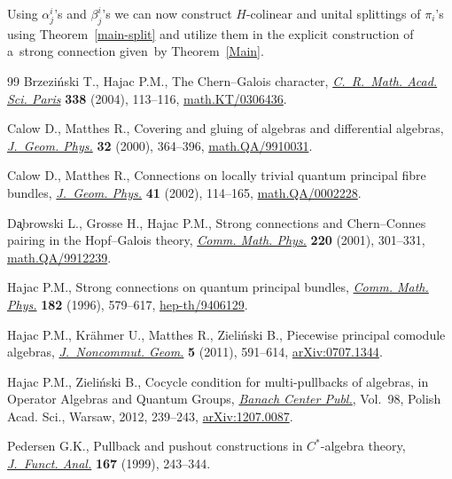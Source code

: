 \documentclass[11pt]{article}
\let\originalcedilla\c
\renewcommand{\c}[1]{{\fontspec{DejaVu Serif}\originalcedilla{#1}}}
\begin{document}
Using $\alpha^i_j$'s and $\beta^i_j$'s we can now construct $H$-colinear and unital splittings of $\pi_i$'s using
Theo\-rem~\ref{main-split} and utilize them in the explicit construction of a~strong connection given~by
Theorem~\ref{Main}.
\begin{thebibliography}{99}
Brzezi{\'n}ski T., Hajac P.M., The {C}hern--{G}alois character,
  \href{http://dx.doi.org/10.1016/j.crma.2003.11.009}{\textit{C.~R.~Math. Acad. Sci. Paris}} \textbf{338} (2004), 113--116,
  \href{http://arxiv.org/abs/math.KT/0306436}{math.KT/0306436}.

Calow D., Matthes R., Covering and gluing of algebras and differential
  algebras, \href{http://dx.doi.org/10.1016/S0393-0440(99)00035-2}{\textit{J.~Geom. Phys.}} \textbf{32} (2000), 364--396,
  \href{http://arxiv.org/abs/math.QA/9910031}{math.QA/9910031}.

Calow D., Matthes R., Connections on locally trivial quantum principal fibre
  bundles, \href{http://dx.doi.org/10.1016/S0393-0440(01)00050-X}{\textit{J.~Geom. Phys.}} \textbf{41} (2002), 114--165,
  \href{http://arxiv.org/abs/math.QA/0002228}{math.QA/0002228}.

D\c{a}browski L., Grosse H., Hajac P.M., Strong connections and
  {C}hern--{C}onnes pairing in the {H}opf--{G}alois theory, \href{http://dx.doi.org/10.1007/s002200100433}{\textit{Comm. Math.
  Phys.}} \textbf{220} (2001), 301--331, \href{http://arxiv.org/abs/math.QA/9912239}{math.QA/9912239}.

Hajac P.M., Strong connections on quantum principal bundles, \href{http://dx.doi.org/10.1007/BF02506418}{\textit{Comm.
  Math. Phys.}} \textbf{182} (1996), 579--617, \href{http://arxiv.org/abs/hep-th/9406129}{hep-th/9406129}.

Hajac P.M., Kr{\"a}hmer U., Matthes R., Zieli{\'n}ski B., Piecewise principal
  comodule algebras, \href{http://dx.doi.org/10.4171/JNCG/88}{\textit{J.~Noncommut. Geom.}} \textbf{5} (2011), 591--614,
  \href{http://arxiv.org/abs/0707.1344}{arXiv:0707.1344}.

Hajac P.M., Zieli{\'n}ski B., Cocycle condition for multi-pullbacks of
  algebras, in Operator Algebras and Quantum Groups, \href{http://dx.doi.org/10.4064/bc98-0-9}{\textit{Banach Center
  Publ.}}, Vol.~98, Polish Acad. Sci., Warsaw, 2012, 239--243,
  \href{http://arxiv.org/abs/1207.0087}{arXiv:1207.0087}.

Pedersen G.K., Pullback and pushout constructions in {$C^*$}-algebra theory,
  \href{http://dx.doi.org/10.1006/jfan.1999.3456}{\textit{J.~Funct. Anal.}} \textbf{167} (1999), 243--344.

\end{thebibliography}
\end{document}
